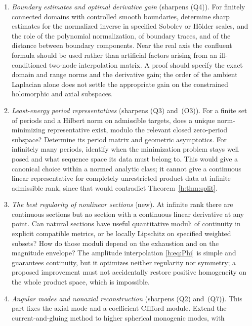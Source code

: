 \documentclass[11pt,a4paper]{article}
\numberwithin{equation}{section}
\theoremstyle{definition}
\theoremstyle{remark}
\theoremstyle{plain}
\begin{document}
\begin{enumerate}[label=\textup{(R\arabic*)}]
local singularities change simultaneously. Combining the symmetry
classification of \S\ref{h:sec:holes} with the residue filtration of
Part~XIII appears a natural way to formulate the transition problem.
\item \emph{Boundary estimates and optimal derivative gain} (sharpens (Q4)).
For finitely connected domains with controlled smooth boundaries, determine
sharp estimates for the normalized inverse in specified Sobolev or H\"older
scales, and the role of the polynomial normalization, of boundary traces, and
of the distance between boundary components. Near the real axis the confluent
formula should be used rather than artificial factors arising from an
ill-conditioned two-node interpolation matrix. A proof should specify the exact
domain and range norms and the derivative gain; the order of the ambient
Laplacian alone does not settle the appropriate gain on the constrained
holomorphic and axial subspaces.
\item \emph{Least-energy period representatives} (sharpens (Q3) and~(O3)). For
a finite set of periods and a Hilbert norm on admissible targets, does a unique
norm-minimizing representative exist, modulo the relevant closed zero-period
subspace? Determine its period matrix and geometric asymptotics. For
infinitely many periods, identify when the minimization problem stays well
posed and what sequence space its data must belong to. This would give a
canonical choice within a normed analytic class; it cannot give a continuous
linear representative for completely unrestricted product data at infinite
admissible rank, since that would contradict Theorem~\ref{h:thm:split}.
\item \emph{The best regularity of nonlinear sections} (new). At infinite rank
there are continuous sections but no section with a continuous linear
derivative at any point. Can natural sections have useful quantitative moduli
of continuity in explicit compatible metrics, or be locally Lipschitz on
specified weighted subsets? How do those moduli depend on the exhaustion and on
the magnitude envelope? The amplitude interpolation \eqref{h:eq:Phi} is simple
and guarantees continuity, but it optimizes neither regularity nor symmetry;
a proposed improvement must not accidentally restore positive homogeneity on
the whole product space, which is impossible.
\item \emph{Angular modes and nonaxial reconstruction} (sharpens (Q2)
and~(Q7)). This part fixes the axial mode and a coefficient Clifford module.
Extend the current-and-gluing method to higher spherical monogenic modes, with

\end{enumerate}
\end{document}
